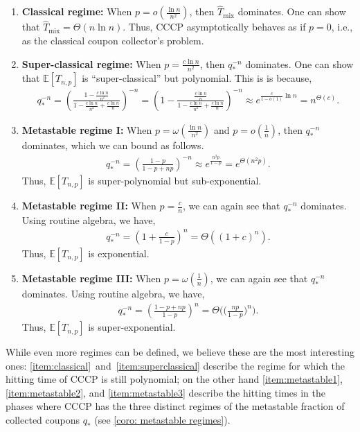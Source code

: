 \documentclass[11pt,a4paper]{article}
\newcommand{\E}{\mathbb{E}}
\newcommand{\Tmar}{\hat{T}_{\mathrm{mix}}}
\begin{document}
\begin{enumerate}
\item \label{item:classical}\textbf{Classical regime:} When $p=o(\frac{\ln n}{n^2})$, then $\Tmar$ dominates. One can show that $\Tmar=\Theta(n\ln n)$. Thus, CCCP asymptotically behaves as if $p=0$, i.e., as the classical coupon collector's problem.
\item\label{item:superclassical} \textbf{Super-classical regime:} When $p=\frac{c\ln n}{n^2}$, then $q_*^{-n}$ dominates. One can show that $\E[T_{n,p}]$ is ``super-classical'' but polynomial. This is is because,
\begin{align*}
    q_{*}^{-n}=\left(\frac{1-\frac{c\ln n}{n^2}}{1-\frac{c\ln n}{n^2}+\frac{c\ln n}{n}}\right)^{-n}=\left(1-\frac{\frac{c\ln n}{n}}{1-\frac{c\ln n}{n^2}+\frac{c\ln n}{n}}\right)^{-n}\approx e^{\frac{c}{1-o(1)}\ln n}=n^{\Theta(c)}. 
\end{align*}
\item\label{item:metastable1} \textbf{Metastable regime I:} When $p=\omega(\frac{\ln n}{n^2})$ and $p=o(\frac{1}{n})$, then $q_*^{-n}$ dominates, which we can bound as follows.
\begin{align*}
    q_{*}^{-n}=\left(\frac{1-p}{1-p+np}\right)^{-n}\approx e^{\frac{n^2p}{1-p}}=e^{\Theta(n^2p)}.
\end{align*}
Thus, $\E[T_{n,p}]$ is super-polynomial but sub-exponential.
\item\label{item:metastable2}\textbf{Metastable regime II:}  When $p=\frac{c}{n}$, we can again see that $q_*^{-n}$ dominates. Using routine algebra, we have,
\begin{align*}
    q_*^{-n}=\left({1+\frac{c}{1-p}}\right)^{n}=\Theta((1+c)^n).
\end{align*}
Thus, $\E[T_{n,p}]$ is exponential.
\item\label{item:metastable3} \textbf{Metastable regime III:} When $p=\omega(\frac{1}{n})$, we can again see that $q_*^{-n}$ dominates. Using routine algebra, we have,
\begin{align*}
    q_*^{-n}=\left(\frac{1-p+np}{1-p}\right)^{n}=\Theta\bigg(\Big(\frac{np}{1-p}\Big)^n\bigg).
\end{align*}
Thus, $\E[T_{n,p}]$ is super-exponential.
\end{enumerate}
While even more regimes can be defined, we believe these are the most interesting ones: 
\ref{item:classical}~and~\ref{item:superclassical} describe the regime for which the hitting time of CCCP is still polynomial; on the other hand \ref{item:metastable1}, \ref{item:metastable2}, and \ref{item:metastable3} describe the hitting times in the phases where CCCP has the three distinct regimes of the metastable fraction of collected coupons $q_*$ (see \cref{coro: metastable regimes}).
\end{document}
